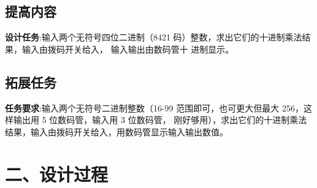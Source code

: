 \documentclass{article}
\newcommand{\fourhao}{\fontsize{14pt}{\baselineskip}\selectfont} %
\newcommand{\xiaosihao}{\fontsize{12pt}{\baselineskip}\selectfont} %
\begin{document}
\subsection*{提高内容}
\textbf{设计任务}:输入两个无符号四位二进制（8421 码）整数，求出它们的十进制乘法结果，输入由拨码开关给入，
输入输出由数码管十
进制显示。\\
\subsection*{拓展任务}
\textbf{任务要求}:输入两个无符号二进制整数（16-99 范围即可，也可更大但最大 256，这样输出用 5 位数码管，输入用 3 位数码管，
刚好够用），求出它们的十进制乘法结果，输入由拨码开关给入，用数码管显示输入输出数值。\\

\section*{\fourhao 二、设计过程}
\xiaosihao
{}
\end{document}

